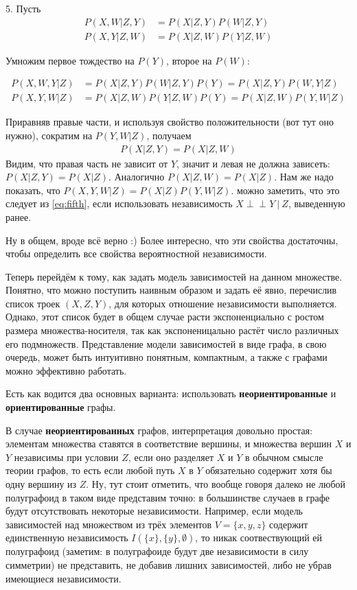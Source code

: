 \documentclass[fleqn]{article}
\newcommand{\independent}{\perp \!\!\! \perp}
\begin{document}
5. Пусть
\begin{align}
	P(X,W|Z,Y) &= P(X|Z,Y)P(W|Z,Y)\\
	P(X,Y|Z,W) &= P(X|Z,W)P(Y|Z,W)
\end{align}

Умножим первое тождество на $P(Y)$, второе на $P(W)$:

\begin{align}
	P(X,W,Y|Z) &= P(X|Z,Y)P(W|Z,Y) P(Y) = P(X|Z,Y)P(W,Y|Z)\label{eq:fifth}\\
	P(X,Y,W|Z) &= P(X|Z,W)P(Y|Z,W) P(Y) = P(X|Z,W)P(Y,W|Z)
\end{align}

Приравняв правые части, и используя свойство положительности (вот тут оно нужно), сократим на $P(Y,W|Z)$, получаем
\begin{align}
	P(X|Z,Y) = P(X|Z,W)
\end{align}
Видим, что правая часть не зависит от $Y$, значит и левая не должна зависеть: $P(X|Z,Y) = P(X|Z)$. Аналогично $P(X|Z,W) = P(X|Z)$.
Нам же надо показать, что $P(X,Y,W|Z) = P(X|Z)P(Y,W|Z)$. можно заметить, что это следует из \ref{eq:fifth}, если использовать независимость $X \independent Y\ | \ Z$, выведенную ранее.

Ну в общем, вроде всё верно :) Более интересно, что эти свойства достаточны, чтобы определить все свойства вероятностной независимости.

Теперь перейдём к тому, как задать модель зависимостей на данном множестве. Понятно, что можно поступить наивным образом и задать её явно, перечислив список троек $(X, Z, Y)$, для которых отношение независимости выполняется. Однако, этот список будет в общем случае расти экспоненциально с ростом размера множества-носителя, так как экспоненицально растёт число различных его подмножеств. Представление модели зависимостей в виде графа, в свою очередь, может быть интуитивно понятным, компактным, а также с графами можно эффективно работать.

Есть как водится два основных варианта: использовать \textbf{неориентированные} и \textbf{ориентированные} графы.

В случае \textbf{неориентированных} графов, интерпретация довольно простая: элементам множества ставятся в соответствие вершины, и множества вершин $X$ и $Y$ независимы при условии $Z$, если оно разделяет $X$ и $Y$ в обычном смысле теории графов, то есть если любой путь $X$ в $Y$ обязательно содержит хотя бы одну вершину из $Z$. 
Ну, тут стоит отметить, что вообще говоря далеко не любой полуграфоид в таком виде представим точно: в большинстве случаев в графе будут отсутствовать некоторые независимости. Например, если модель зависимостей над множеством из трёх элементов $V = \{x,y,z\}$ содержит единственную независимость
 $I(\{x\}, \{y\}, \emptyset)$, то никак соотвествующий ей полуграфоид  (заметим: в полуграфоиде будут две независимости в силу симметрии) не представить, не добавив лишних зависимостей, либо не убрав имеющиеся независимости.
 
\end{document}
